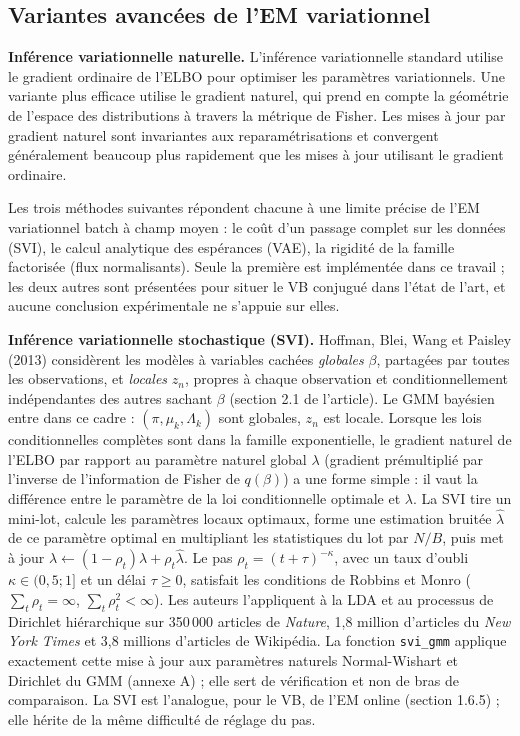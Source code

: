 \subsection{Variantes avancées de l'EM variationnel}
\textbf{Inférence variationnelle naturelle. }L'inférence variationnelle standard utilise le gradient ordinaire de l'ELBO pour optimiser les paramètres variationnels. Une variante plus efficace utilise le gradient naturel, qui prend en compte la géométrie de l'espace des distributions à travers la métrique de Fisher. Les mises à jour par gradient naturel sont invariantes aux reparamétrisations et convergent généralement beaucoup plus rapidement que les mises à jour utilisant le gradient ordinaire.

Les trois méthodes suivantes répondent chacune à une limite précise de l'EM variationnel batch à champ moyen : le coût d'un passage complet sur les données (SVI), le calcul analytique des espérances (VAE), la rigidité de la famille factorisée (flux normalisants). Seule la première est implémentée dans ce travail ; les deux autres sont présentées pour situer le VB conjugué dans l'état de l'art, et aucune conclusion expérimentale ne s'appuie sur elles.

\textbf{Inférence variationnelle stochastique (SVI). }Hoffman, Blei, Wang et Paisley (2013) considèrent les modèles à variables cachées \emph{globales} $\beta$, partagées par toutes les observations, et \emph{locales} $z_n$, propres à chaque observation et conditionnellement indépendantes des autres sachant $\beta$ (section 2.1 de l'article). Le GMM bayésien entre dans ce cadre : $(\pi, \mu_k, \Lambda_k)$ sont globales, $z_n$ est locale. Lorsque les lois conditionnelles complètes sont dans la famille exponentielle, le gradient naturel de l'ELBO par rapport au paramètre naturel global $\lambda$ (gradient prémultiplié par l'inverse de l'information de Fisher de $q(\beta)$) a une forme simple : il vaut la différence entre le paramètre de la loi conditionnelle optimale et $\lambda$. La SVI tire un mini-lot, calcule les paramètres locaux optimaux, forme une estimation bruitée $\hat\lambda$ de ce paramètre optimal en multipliant les statistiques du lot par $N/B$, puis met à jour $\lambda \leftarrow (1 - \rho_t)\lambda + \rho_t \hat\lambda$. Le pas $\rho_t = (t + \tau)^{-\kappa}$, avec un taux d'oubli $\kappa \in (0{,}5 ; 1]$ et un délai $\tau \geq 0$, satisfait les conditions de Robbins et Monro ($\sum_t \rho_t = \infty$, $\sum_t \rho_t^2 < \infty$). Les auteurs l'appliquent à la LDA et au processus de Dirichlet hiérarchique sur 350\,000 articles de \emph{Nature}, 1,8 million d'articles du \emph{New York Times} et 3,8 millions d'articles de Wikipédia. La fonction \texttt{svi\_gmm} applique exactement cette mise à jour aux paramètres naturels Normal-Wishart et Dirichlet du GMM (annexe A) ; elle sert de vérification et non de bras de comparaison. La SVI est l'analogue, pour le VB, de l'EM online (section 1.6.5) ; elle hérite de la même difficulté de réglage du pas.


